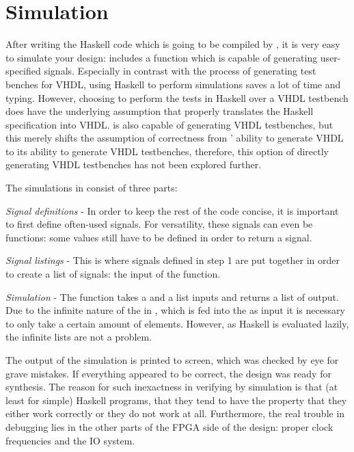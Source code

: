 

\section{Simulation}
After writing the Haskell code which is going to be compiled by \clash{}, it is very easy to simulate your design: \clash{} includes a  function which is capable of generating user-specified signals. Especially in contrast with the process of generating test benches for VHDL, using Haskell to perform simulations saves a lot of time and typing. However, choosing to perform the tests in Haskell over a VHDL testbench does have the underlying assumption that \clash{} properly translates the Haskell specification into VHDL. \clash{} is also capable of generating VHDL testbenches, but this merely shifts the assumption of correctness from \clash{}' ability to generate VHDL to its ability to generate VHDL testbenches, therefore, this option of directly generating VHDL testbenches has not been explored further.



The simulations in \clash{} consist of three parts:
\begin{enumeratens}
\item \emph{Signal definitions} - In order to keep the rest of the code concise, it is important to first define often-used signals. For versatility, these signals can even be functions: some values still have to be defined in order to return a signal.
\item \emph{Signal listings} - This is where signals defined in step 1 are put together in order to create a list of signals: the input of the  function.
\item \emph{Simulation} - The  function takes a  and a list inputs and returns a list of output. Due to the infinite nature of the  in \clash{}, which is fed into the  as input it is necessary to only take a certain amount of elements. However, as Haskell is evaluated lazily, the infinite lists are not a problem. 
\end{enumeratens}

The output of the simulation is printed to screen, which was checked by eye for grave mistakes. If everything appeared to be correct, the design was ready for synthesis. The reason for such inexactness in verifying by simulation is that (at least for simple) Haskell programs, that they tend to have the property that they either work correctly or they do not work at all. Furthermore, the real trouble in debugging lies in the other parts of the FPGA side of the design: proper clock frequencies and the IO system.

